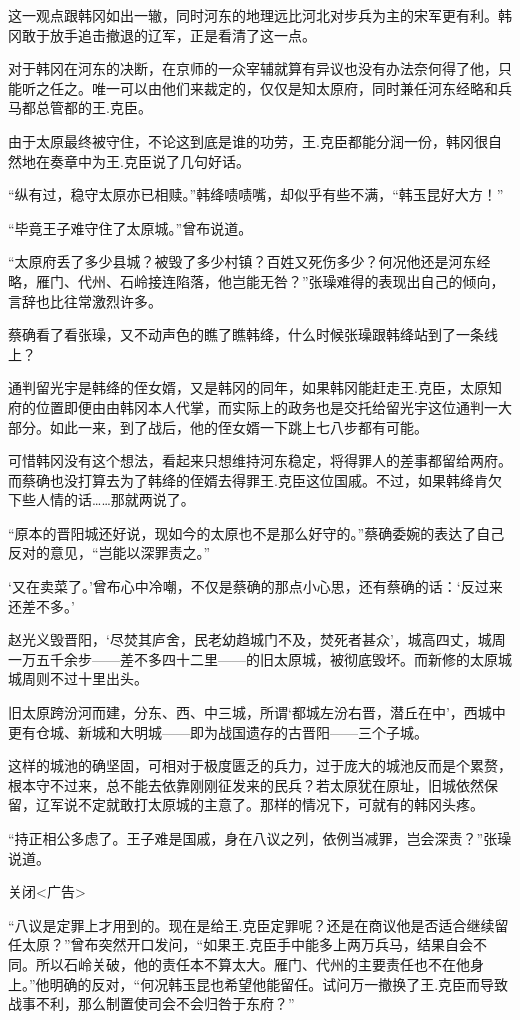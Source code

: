 这一观点跟韩冈如出一辙，同时河东的地理远比河北对步兵为主的宋军更有利。韩冈敢于放手追击撤退的辽军，正是看清了这一点。

对于韩冈在河东的决断，在京师的一众宰辅就算有异议也没有办法奈何得了他，只能听之任之。唯一可以由他们来裁定的，仅仅是知太原府，同时兼任河东经略和兵马都总管都的王.克臣。

由于太原最终被守住，不论这到底是谁的功劳，王.克臣都能分润一份，韩冈很自然地在奏章中为王.克臣说了几句好话。

“纵有过，稳守太原亦已相赎。”韩绛啧啧嘴，却似乎有些不满，“韩玉昆好大方！”

“毕竟王子难守住了太原城。”曾布说道。

“太原府丢了多少县城？被毁了多少村镇？百姓又死伤多少？何况他还是河东经略，雁门、代州、石岭接连陷落，他岂能无咎？”张璪难得的表现出自己的倾向，言辞也比往常激烈许多。

蔡确看了看张璪，又不动声色的瞧了瞧韩绛，什么时候张璪跟韩绛站到了一条线上？

通判留光宇是韩绛的侄女婿，又是韩冈的同年，如果韩冈能赶走王.克臣，太原知府的位置即便由由韩冈本人代掌，而实际上的政务也是交托给留光宇这位通判一大部分。如此一来，到了战后，他的侄女婿一下跳上七八步都有可能。

可惜韩冈没有这个想法，看起来只想维持河东稳定，将得罪人的差事都留给两府。而蔡确也没打算去为了韩绛的侄婿去得罪王.克臣这位国戚。不过，如果韩绛肯欠下些人情的话……那就两说了。

“原本的晋阳城还好说，现如今的太原也不是那么好守的。”蔡确委婉的表达了自己反对的意见，“岂能以深罪责之。”

‘又在卖菜了。’曾布心中冷嘲，不仅是蔡确的那点小心思，还有蔡确的话：‘反过来还差不多。’

赵光义毁晋阳，‘尽焚其庐舍，民老幼趋城门不及，焚死者甚众’，城高四丈，城周一万五千余步——差不多四十二里——的旧太原城，被彻底毁坏。而新修的太原城城周则不过十里出头。

旧太原跨汾河而建，分东、西、中三城，所谓‘都城左汾右晋，潜丘在中’，西城中更有仓城、新城和大明城——即为战国遗存的古晋阳——三个子城。

这样的城池的确坚固，可相对于极度匮乏的兵力，过于庞大的城池反而是个累赘，根本守不过来，总不能去依靠刚刚征发来的民兵？若太原犹在原址，旧城依然保留，辽军说不定就敢打太原城的主意了。那样的情况下，可就有的韩冈头疼。

“持正相公多虑了。王子难是国戚，身在八议之列，依例当减罪，岂会深责？”张璪说道。

关闭<广告>

“八议是定罪上才用到的。现在是给王.克臣定罪呢？还是在商议他是否适合继续留任太原？”曾布突然开口发问，“如果王.克臣手中能多上两万兵马，结果自会不同。所以石岭关破，他的责任本不算太大。雁门、代州的主要责任也不在他身上。”他明确的反对，“何况韩玉昆也希望他能留任。试问万一撤换了王.克臣而导致战事不利，那么制置使司会不会归咎于东府？”

